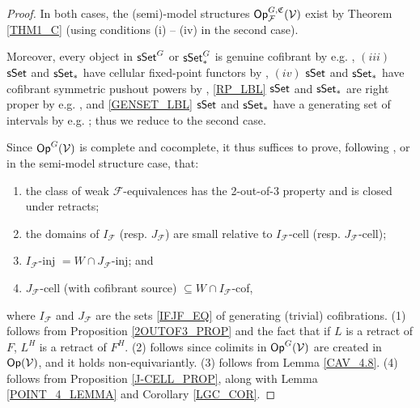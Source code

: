 \documentclass[a4paper,10pt
,draft
]{article}%
\renewcommand{\F}{\mathcal F}
\renewcommand{\1}{\eta}%
\begin{document}
\begin{proof}
      In both cases, the (semi)-model structures $\Op_\F^{G, \mathfrak C}(\V)$ exist by Theorem \ref{THM1_C}
      (using conditions (i) -- (iv) in the second case).
      
      Moreover,
      every object in $\mathsf{sSet}^G$ or $\sSet^G_{\**}$ is genuine cofibrant by e.g. \cite[Remark 5.71]{BP_geo},
      $(iii)$ $\mathsf{sSet}$ and $\sSet_{\**}$ have cellular fixed-point functors by \cite[Example 2.14]{Ste16},
      $(iv)$ $\mathsf{sSet}$ and $\sSet_{\**}$ have cofibrant symmetric pushout powers by \cite[Remark 6.18]{BP_geo},
      \ref{RP_LBL} $\mathsf{sSet}$ and $\sSet_{\**}$ are right proper by e.g. \cite[Thm. 2.1.1 and Prop 4.1.1]{JT_simp},
      and
      \ref{GENSET_LBL} $\mathsf{sSet}$ and $\sSet_{\**}$ have a generating set of intervals
      by e.g. \cite[Lemma 1.12]{BM13};
      thus we reduce to the second case.
      
      Since $\mathsf{Op}^G(\mathcal V)$ is complete and cocomplete, it thus suffices to prove,
      following \cite[Theorem 2.1.19]{Hov}, or \cite[Theorem 2.2.2]{WY} in the semi-model structure case, that:
      \begin{enumerate}[label = (\arabic*)]
      \item the class of weak $\F$-equivalences has the 2-out-of-3 property and is closed under retracts;
      \item the domains of $I_{\F}$ (resp. $J_{\F}$) are small relative to $I_{\F}$-cell (resp. $J_{\F}$-cell);
      \item $I_{\F}$-inj $= W\cap J_{\F}$-inj; and
      \item $J_{\F}$-cell (with cofibrant source) $\subseteq W\cap I_{\F}$-cof,
      \end{enumerate}
      where $I_\F$ and $J_\F$ are the sets \eqref{IFJF_EQ} of generating (trivial) cofibrations.
      (1) follows from Proposition \ref{2OUTOF3_PROP} and the fact that if $L$ is a retract of $F$, $L^H$ is a retract of $F^H$.
      (2) follows since colimits in $\mathsf{Op}^G(\mathcal V)$ are created in $\mathsf{Op}(\mathcal V)$, and it holds non-equivariantly.
      (3) follows from Lemma \ref{CAV_4.8}.
      (4) follows from Proposition \ref{J-CELL_PROP}, along with Lemma \ref{POINT_4_LEMMA} and Corollary \ref{LGC_COR}.
\end{proof}
\end{document}
